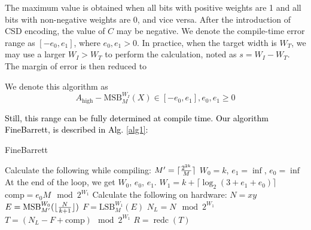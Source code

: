 \documentclass[conference]{IEEEtran}
\begin{document}
The maximum value is obtained when all bits with positive weights are 1 and all bits with non-negative weights are 0, and vice versa. After the introduction of CSD encoding, the value of $C$ may be negative. We denote the compile-time error range as $[-e_0, e_1]$, where $e_0,e_1 > 0$. In practice, when the target width is $W_T$, we may use a larger $W_I > W_T$ to perform the calculation, noted as $s = W_I - W_T$. The margin of error is then reduced to
\begin{equation}
    [-{\lceil{{e_0}\over 2^s}\rceil}, {\lceil{{e_1}\over 2^s}\rceil}]
\end{equation}


We denote this algorithm as
\begin{equation}
    A_\text{high} - \text{MSB}^{W_I}_M(X) \in [-e_0, e_1], e_0,e_1 \ge 0
\end{equation}


\textcolor{black}{
Still, this range can be fully determined at compile time. Our algorithm FineBarrett, is described in Alg. \ref{alg1}:
}

\begin{algorithm}[ht]
    \caption{FineBarrett} %
    \label{alg1}
	\LinesNumbered %
    \KwIn{$x,y \in [0, 2^k)$, $M \in [2^{k-1}, 2^k)$, Error tolerance $G$} %
    Calculate the following while compiling: \;
    $ M' = \lceil {2^{2k} \over M} \rceil$ \;
    $W_0 = k$, $e_1 = \inf$, $e_0 = \inf$ \;
    At the end of the loop, we get $W_0$, $e_0$, $e_1$. \;
    $W_1 = k+ \lceil \log_2(3 + e_1 + e_0)\rceil$ \;
    $\text{comp} = e_0M \mod 2^{W_1}$ \;
     Calculate the following on hardware: \;
     $N = xy$ \;
     $E = \text{MSB}^{W_0}_{M'}(\lfloor {N\over {k+1}} \rfloor)$ \;
     $F =\text{LSB}^{W_1}_M(E)$ \;
     $N_L = N \mod 2^{W_1}$ \;
     $T = (N_L - F + \text{comp}) \mod 2^{W_1}$ \;
     $R =\operatorname{redc}(T)$ \;
\end{algorithm}
\end{document}

